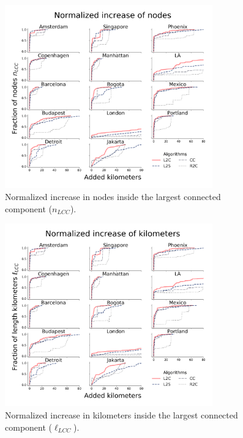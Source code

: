 \begin{figure}[h!]
  \centering
  \includegraphics[width=0.8\textwidth]{images/datadriven/SI_Nodes.png}
  \caption{Normalized increase in nodes inside the largest connected component ($n_{LCC}$).}
  \label{fig:NodesIncrease}
\end{figure}

\begin{figure}[h!]
  \centering
  \includegraphics[width=0.8\textwidth]{images/datadriven/SI_Lengths.png}
  \caption{Normalized increase in kilometers inside the largest connected component ($\ell_{LCC}$).}
  \label{fig:LengthsIncrease}
\end{figure}

